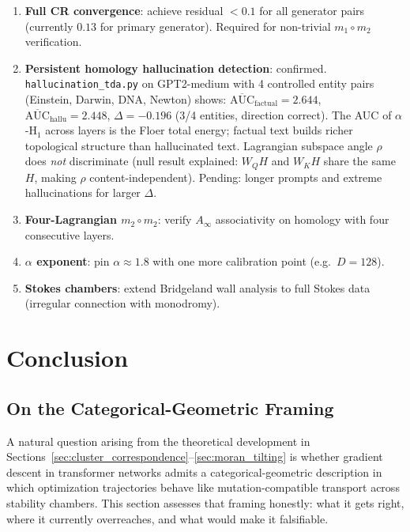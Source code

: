 \documentclass[11pt]{amsart}
\begin{document}
\begin{enumerate}
\item \textbf{Full CR convergence}: achieve residual $<0.1$ for all
  generator pairs (currently $0.13$ for primary generator).
  Required for non-trivial $m_1\circ m_2$ verification.
\item \textbf{Persistent homology hallucination detection}: confirmed.
  \texttt{hallucination\_tda.py} on GPT2-medium with 4 controlled entity pairs
  (Einstein, Darwin, DNA, Newton) shows:
  $\overline{\mathrm{AUC}}_\text{factual} = 2.644$,
  $\overline{\mathrm{AUC}}_\text{hallu} = 2.448$,
  $\Delta = -0.196$ (3/4 entities, direction correct).
  The AUC of $\alpha$-H$_1$ across layers is the Floer total energy;
  factual text builds richer topological structure than hallucinated text.
  Lagrangian subspace angle $\rho$ does \emph{not} discriminate
  (null result explained: $W_Q H$ and $W_K H$ share the same $H$,
  making $\rho$ content-independent).
  Pending: longer prompts and extreme hallucinations for larger $\Delta$.
\item \textbf{Four-Lagrangian $m_2\circ m_2$}: verify $A_\infty$
  associativity on homology with four consecutive layers.
\item \textbf{$\alpha$ exponent}: pin $\alpha\approx 1.8$ with one more
  calibration point (e.g.\ $D=128$).
\item \textbf{Stokes chambers}: extend Bridgeland wall analysis to
  full Stokes data (irregular connection with monodromy).
\end{enumerate}

\section{Conclusion}
\label{sec:conclusion}

\subsection{On the Categorical-Geometric Framing}
\label{sec:framing}

A natural question arising from the theoretical development in
Sections~\ref{sec:cluster_correspondence}--\ref{sec:moran_tilting}
is whether gradient descent in transformer networks admits a
categorical-geometric description in which optimization trajectories
behave like mutation-compatible transport across stability chambers.
This section assesses that framing honestly: what it gets right,
where it currently overreaches, and what would make it falsifiable.
\end{document}

